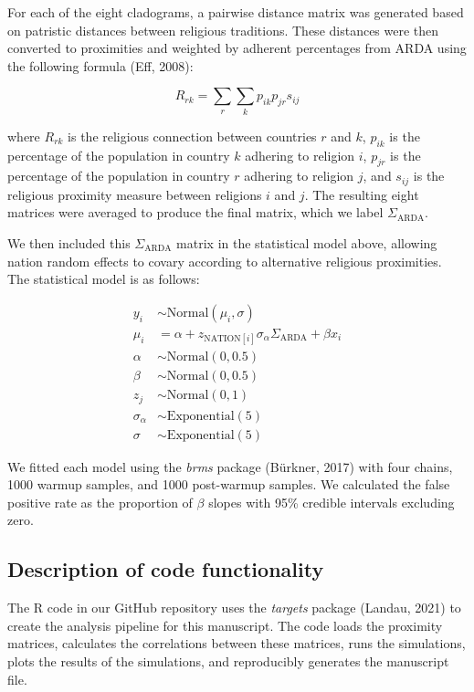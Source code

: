 \documentclass[
  11pt,
]{article}
\begin{document}
For each of the eight cladograms, a pairwise distance matrix was generated based
on patristic distances between religious traditions. These distances were then 
converted to proximities and weighted by adherent percentages from ARDA 
using the following formula (Eff, 2008):

\[R_{rk} = \sum_{r} \sum_{k} p_{ik} p_{jr} s_{ij}\]

where $R_{rk}$ is the religious connection between countries $r$ and $k$,
$p_{ik}$ is the percentage of the population in country $k$ adhering to religion
$i$, $p_{jr}$ is the percentage of the population in country $r$ adhering to 
religion $j$, and $s_{ij}$ is the religious proximity measure between religions
$i$ and $j$. The resulting eight matrices were averaged to produce the final
matrix, which we label $\Sigma_\text{ARDA}$.

We then included this $\Sigma_\text{ARDA}$ matrix in the statistical model 
above, allowing nation random effects to covary according to alternative
religious proximities. The statistical model is as follows:

\begin{align}
y_{i} &\sim \text{Normal}(\mu_{i},\sigma) \nonumber \\
\mu_{i} &= \alpha + z_{\text{NATION}[i]}\sigma_{\alpha}\Sigma_\text{ARDA} + 
\beta x_{i} \nonumber \\
\alpha &\sim \text{Normal}(0, 0.5) \nonumber \\
\beta &\sim \text{Normal}(0, 0.5) \nonumber \\
z_{j} &\sim \text{Normal}(0, 1) \nonumber \\
\sigma_{\alpha} &\sim \text{Exponential}(5) \nonumber \\
\sigma &\sim \text{Exponential}(5) \nonumber
\end{align}

We fitted each model using the \textit{brms} package (Bürkner, 2017) with four 
chains, 1000 warmup samples, and 1000 post-warmup samples. We calculated the 
false positive rate as the proportion of $\beta$ slopes with 95\% credible 
intervals excluding zero.

\subsection*{Description of code functionality}

The R code in our GitHub repository uses the \textit{targets} package
(Landau, 2021) to create the analysis pipeline for this manuscript. The code 
loads the proximity matrices, calculates the correlations between these
matrices, runs the simulations, plots the results of the simulations, and
reproducibly generates the manuscript file.
\end{document}

